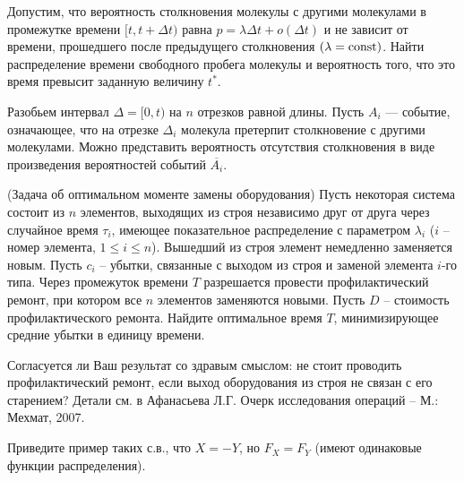 

\begin{problem}
Допустим, что вероятность столкновения молекулы с другими молекулами в промежутке времени $[t,t + \Delta t)$ 
равна $p = \lambda\Delta t + o(\Delta t)$ и не зависит от времени, прошедшего после предыдущего столкновения $(\lambda = \mathop{\mathrm{const}}\nolimits)$. 
Найти распределение времени свободного пробега молекулы и вероятность того, что это время превысит заданную величину $t^*$. 
\end{problem}

\begin{ordre}
Разобьем интервал $\Delta=[0,t)$ на $n$ отрезков равной длины.
Пусть $A_i$ --- событие, означающее, что на отрезке $\Delta_i$  молекула претерпит столкновение с другими молекулами. Можно представить вероятность отсутствия столкновения в виде произведения вероятностей событий $\overline{A_i}$.
\end{ordre}

\begin{problem}(Задача об оптимальном моменте замены оборудования)
Пусть некоторая система состоит из $n$ элементов, выходящих из строя независимо друг от друга через случайное время $\tau _{i} $, имеющее показательное распределение с параметром $\lambda _{i} $ ($i$ -- номер элемента, $1\le i\le n$). Вышедший из строя элемент немедленно заменяется новым. Пусть $c_{i} $ -- убытки, связанные с выходом из строя и заменой элемента $i$-го типа. Через промежуток времени $T$ разрешается провести профилактический ремонт, при котором все $n$ элементов заменяются новыми. Пусть $D$ -- стоимость профилактического ремонта. Найдите оптимальное время $T$, минимизирующее средние убытки в единицу времени.
\end{problem}

\begin{remark} 
Согласуется ли Ваш результат со здравым смыслом: не стоит проводить профилактический ремонт, если выход оборудования из строя не связан с его старением? Детали см. в Афанасьева Л.Г. Очерк исследования операций -- М.: Мехмат, 2007. 
\end{remark}



\begin{problem}
Приведите пример таких с.в., что $X=-Y$, но $F_X=F_Y$  (имеют одинаковые  функции распределения).
\end{problem}

